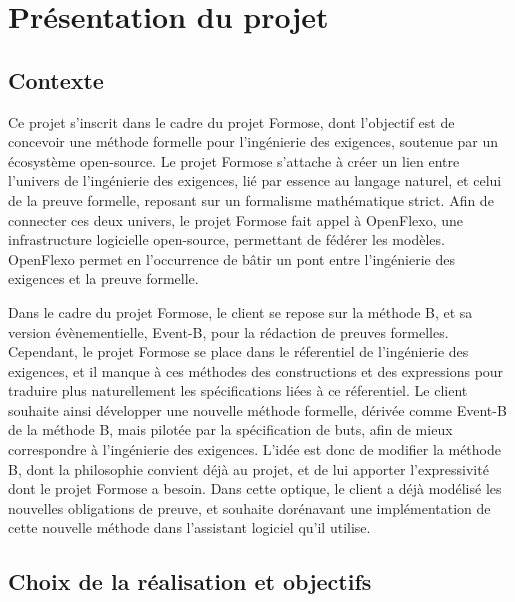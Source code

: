 \chapter*{Présentation du projet}
\label{sec:introduction}

\section*{Contexte}
\label{sec:contexte}

Ce projet s'inscrit dans le cadre du projet Formose, dont l'objectif est de concevoir une méthode formelle pour l'ingénierie %
des exigences, soutenue par un écosystème open-source.
Le projet Formose s'attache à créer un lien entre l'univers de l'ingénierie des exigences, lié par essence au langage naturel, %
et celui de la preuve formelle, reposant sur un formalisme mathématique strict.
Afin de connecter ces deux univers, le projet Formose fait appel à OpenFlexo, une infrastructure logicielle open-source, permettant de fédérer les modèles.
OpenFlexo permet en l'occurrence de bâtir un pont entre l'ingénierie des exigences et la preuve formelle.

Dans le cadre du projet Formose, le client se repose sur la méthode B, et sa version évènementielle, Event-B, pour la rédaction de preuves formelles.
Cependant, le projet Formose se place dans le réferentiel de l'ingénierie des exigences, et il manque à ces méthodes des constructions et des expressions %
pour traduire plus naturellement les spécifications liées à ce réferentiel.
Le client souhaite ainsi développer une nouvelle méthode formelle, dérivée comme Event-B de la méthode B, mais pilotée par la spécification de buts, afin de mieux correspondre %
à l'ingénierie des exigences.
L'idée est donc de modifier la méthode B, dont la philosophie convient déjà au projet, et de lui apporter l'expressivité dont le projet Formose a besoin.
Dans cette optique, le client a déjà modélisé les nouvelles obligations de preuve, et souhaite dorénavant une implémentation de cette nouvelle méthode dans l'assistant logiciel qu'il utilise.


\section*{Choix de la réalisation et objectifs}
\label{sec:objectifs}

